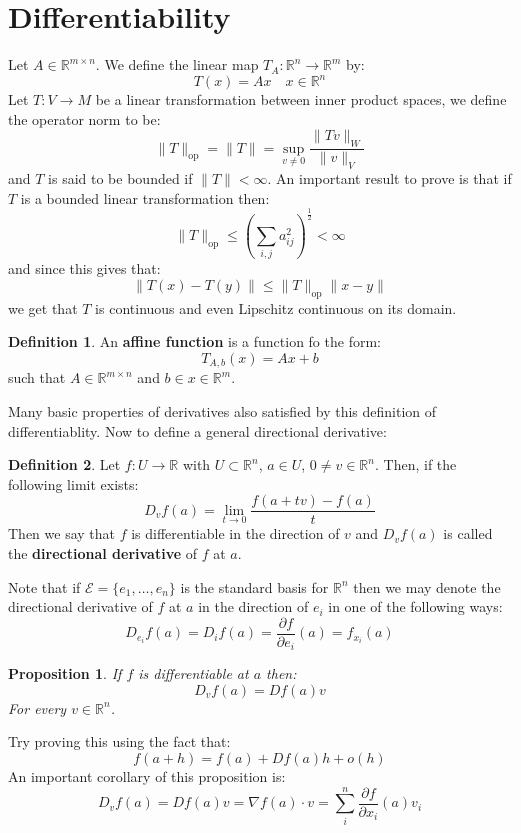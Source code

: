 \documentclass[11pt,a4paper]{article}
\theoremstyle{definition}
\newtheorem{definition}{Definition}[section]
\theoremstyle{plain}
\newtheorem{proposition}[theorem]{Proposition}
\newcommand{\R}{\mathbb{R}}
\begin{document}
	\section{Differentiability}
	Let $A \in \R^{m \times n}$. We define the linear map 
	$T_A \colon \R^n \to \R^m$ by:
	\[
		T(x) = Ax \quad x\in \R^n
	\]
	Let $T \colon V \to M$ be a linear transformation between inner product
	spaces, we define the operator norm to be:
	\[
		\|T\|_{\mathrm{op}} = \|T\| = \sup_{v \neq 0}{\frac{\|Tv\|_W}{\|v\|_V}}
	\]
	and $T$ is said to be bounded if $\|T\| < \infty$. An important result
	to prove is that if $T$ is a bounded linear transformation then:
	\[
		\|T\|_{\mathrm{op}} \le 
		\left(\sum_{i,j}{}a_{ij}^{2}\right)^{\frac{1}{2}} < \infty
	\]
	and since this gives that:
	\[
		\|T(x) - T(y)\| \le \|T\|_{\mathrm{op}}\|x-y\|
	\]
	we get that $T$ is continuous and even Lipschitz continuous on its domain.
	\begin{definition}
	An \textbf{affine function} is a function fo the form:
	\[
		T_{A,b}(x) = Ax + b
	\]
	such that $A\in\R^{m \times n}$ and $b\in x\in \R^{m}$.
	\end{definition}
	\noindent Many basic properties of derivatives also satisfied by this
	definition of differentiablity. Now to define a general directional
	derivative:
	\begin{definition}
		Let $f \colon U \to \R$ with $U \subset \R^n$, $a \in U$, $0 \neq v
		\in \R^n$. Then, if the following limit exists:
		\[
			D_v f(a) = \lim_{t \to 0}{\frac{f(a + tv) - f(a)}{t}}
		\]
		Then we say that $f$ is differentiable in the direction of $v$ and
		$D_v f(a)$ is called the \textbf{directional derivative} of $f$ at $a$.
	\end{definition}
	\noindent
	Note that if $\mathcal{E} = \{e_1,\dots,e_n\}$ is the standard basis
	for $\R^n$ then we may denote the directional derivative of $f$ at $a$
	in the direction of $e_i$ in one of the following ways:
	\[
		D_{e_i} f(a) = D_i f(a) = \frac{\partial f}{\partial e_i}(a) = 
		f_{x_i}(a)
	\]
	\begin{proposition}
		If $f$ is differentiable at $a$ then:
			\[
				D_v f(a) = D f(a) v
			\]	
		For every $v \in \R^n$.
	\end{proposition} 
	\noindent Try proving this using the fact that:
	\[
		f(a+h) = f(a) + Df(a)h + o(h)
	\]
	An important corollary of this proposition is:
	\[
		D_vf(a) = D f(a) v = \nabla f(a) \cdot v = 
		\sum_{i}^{n}{\frac{\partial f}{\partial x_i}(a)v_i}
	\]
	
\end{document}
